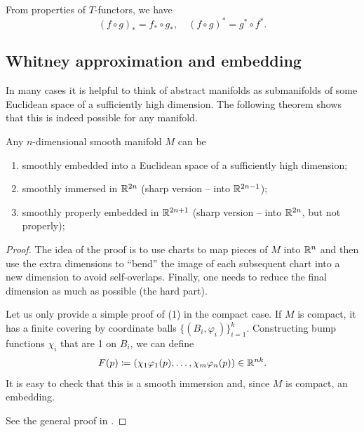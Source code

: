\begin{rem}
    From properties of $T$-functors, we have 
    \[
    (f\circ g)_\ast=f_\ast\circ g_\ast,\quad (f\circ g)^\ast=g^\ast\circ f^\ast.
    \]
\end{rem}

\subsection{Whitney approximation and embedding}

In many cases it is helpful to think of abstract manifolds as submanifolds of some Euclidean space of a sufficiently high dimension. The following theorem shows that this is indeed possible for any manifold.

\begin{thm}\label{thm whitney embedding}
    Any $n$-dimensional smooth manifold $M$ can be
    \begin{enumerate}
        \item smoothly embedded into a Euclidean space of a sufficiently high dimension;
        \item smoothly immersed in $\mathbb{R}^{2n}$ (sharp version -- into $\mathbb{R}^{2n-1}$);
        \item smoothly properly embedded in $\mathbb{R}^{2n+1}$ (sharp version -- into $\mathbb{R}^{2n}$, but not properly);
    \end{enumerate}
    \end{thm}
\begin{proof}
    The idea of the proof is to use charts to map pieces of $M$ into $\mathbb{R}^n$ and then use the extra dimensions to ``bend'' the image of each subsequent chart into a new dimension to avoid self-overlaps. Finally, one needs to reduce the final dimension as much as possible (the hard part).

    Let us only provide a simple proof of (1) in the compact case. If $M$ is compact, it has a finite covering by coordinate balls $\{(B_i,\varphi_i)\}_{i=1}^k$. Constructing bump functions $\chi_i$ that are 1 on $B_i$, we can define
    \[
        F(p)\coloneqq (\chi_1\varphi_1(p),\ldots, \chi_m\varphi_n(p))\in\mathbb{R}^{nk}.
    \]
    It is easy to check that this is a smooth immersion and, since $M$ is compact, an embedding.

    See the general proof in \cite[Thm. 6.15]{Lee}.
\end{proof}


